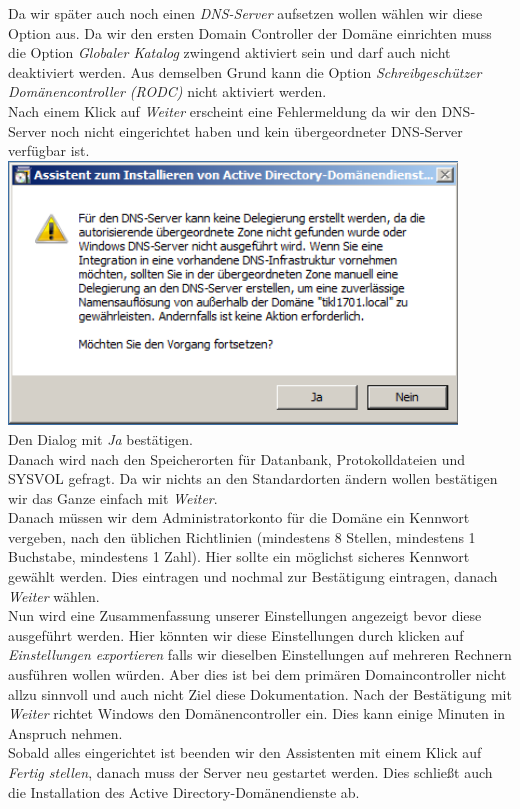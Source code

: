 \documentclass[12pt,a4paper,titlepage]{scrartcl} %
\begin{document}
Da wir später auch noch einen \emph{DNS-Server} aufsetzen wollen wählen wir diese Option aus. Da wir den ersten Domain Controller der Domäne einrichten muss die Option \emph{Globaler Katalog} zwingend aktiviert sein und darf auch nicht deaktiviert werden. Aus demselben Grund kann die Option \emph{Schreibgeschützer Domänencontroller (RODC)} nicht aktiviert werden.\\
Nach einem Klick auf \emph{Weiter} erscheint eine Fehlermeldung da wir den DNS-Server noch nicht eingerichtet haben und kein übergeordneter DNS-Server verfügbar ist.\\

	\includegraphics[height=7cm]{Bilder/022(dcpromo_exe09)}\\
	
Den Dialog mit \emph{Ja} bestätigen.\\
Danach wird nach den Speicherorten für Datanbank, Protokolldateien und SYSVOL gefragt. Da wir nichts an den Standardorten ändern wollen bestätigen wir das Ganze einfach mit \emph{Weiter}.\\
Danach müssen wir dem Administratorkonto für die Domäne ein Kennwort vergeben, nach den üblichen Richtlinien (mindestens 8 Stellen, mindestens 1 Buchstabe, mindestens 1 Zahl). Hier sollte ein möglichst sicheres Kennwort gewählt werden. Dies eintragen und nochmal zur Bestätigung eintragen, danach \emph{Weiter} wählen.\\
Nun wird eine Zusammenfassung unserer Einstellungen angezeigt bevor diese ausgeführt werden. Hier könnten wir diese Einstellungen durch klicken auf \emph{Einstellungen exportieren} falls wir dieselben Einstellungen auf mehreren Rechnern ausführen wollen würden. Aber dies ist bei dem primären Domaincontroller nicht allzu sinnvoll und auch nicht Ziel diese Dokumentation. Nach der Bestätigung mit \emph{Weiter} richtet Windows den Domänencontroller ein. Dies kann einige Minuten in Anspruch nehmen.\\
Sobald alles eingerichtet ist beenden wir den Assistenten mit einem Klick auf \emph{Fertig stellen}, danach muss der Server neu gestartet werden. Dies schließt auch die Installation des Active Directory-Domänendienste ab.
\end{document}
